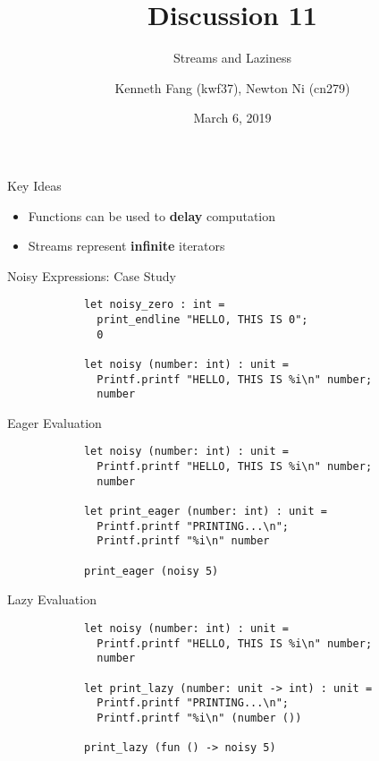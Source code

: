 \documentclass{beamer}
\title{Discussion 11}
\subtitle{Streams and Laziness}
\author{Kenneth Fang (kwf37), Newton Ni (cn279)}
\date{March 6, 2019}
\begin{document}
    \begin{frame}
        \titlepage{}
    \end{frame}

    \begin{frame}{Key Ideas}
        \begin{itemize}
            \item Functions can be used to \textbf{delay} computation
            \item Streams represent \textbf{infinite} iterators
        \end{itemize}
    \end{frame}

    \begin{frame}[fragile=singleslide]{Noisy Expressions: Case Study}
        \begin{verbatim}
            let noisy_zero : int =
              print_endline "HELLO, THIS IS 0";
              0

            let noisy (number: int) : unit =
              Printf.printf "HELLO, THIS IS %i\n" number;
              number
        \end{verbatim}
    \end{frame}

    \begin{frame}[fragile=singleslide]{Eager Evaluation}
        \begin{verbatim}
            let noisy (number: int) : unit =
              Printf.printf "HELLO, THIS IS %i\n" number;
              number

            let print_eager (number: int) : unit =
              Printf.printf "PRINTING...\n";
              Printf.printf "%i\n" number

            print_eager (noisy 5)
        \end{verbatim}
    \end{frame}

    \begin{frame}[fragile=singleslide]{Lazy Evaluation}
        \begin{verbatim}
            let noisy (number: int) : unit =
              Printf.printf "HELLO, THIS IS %i\n" number;
              number

            let print_lazy (number: unit -> int) : unit =
              Printf.printf "PRINTING...\n";
              Printf.printf "%i\n" (number ())

            print_lazy (fun () -> noisy 5)
        \end{verbatim}
    \end{frame}
\end{document}
